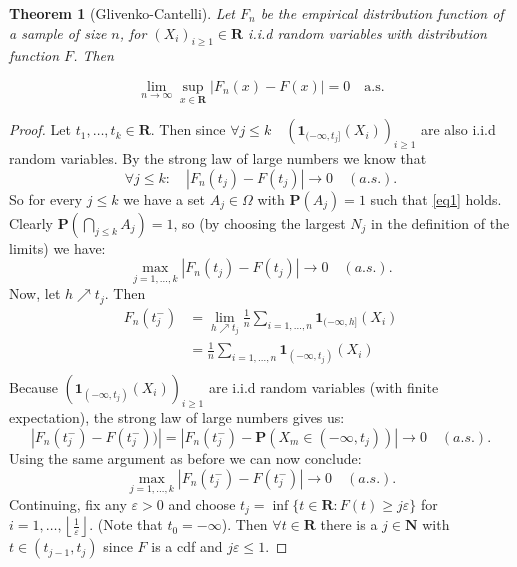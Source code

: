 \documentclass{article}
\newtheorem*{theorem}{Theorem}
\begin{document}
\begin{theorem}[Glivenko-Cantelli]
Let \( F_n \) be the empirical distribution function of a sample of size \( n \),
 for \((X_i)_{i\ge1} \in \mathbf{R}\) i.i.d random variables with distribution function \(F\). Then

\[ \lim_{n \to \infty} \sup_{x \in \mathbf{R}} |F_n(x) - F(x)| = 0 \quad \text{a.s.} \]
\end{theorem}
\begin{proof} 
Let \(t_1,\ldots,t_k \in \mathbf{R}\). Then since \(\forall j\le k \quad (\mathbf{1}_{(-\infty,t_j]}(X_i ))_{i\ge1}\) are also i.i.d random variables.
By the strong law of large numbers we know that 
\begin{equation}
    \label{eq1}
    \forall j \le k: \quad |F_n(t_j)-F(t_j)| \to 0 \quad (a.s.).
\end{equation}
So for every \(j\le k\) we have a set \(A_j \in \Omega\) with \(\mathbf{P}(A_j) = 1\) such that \eqref{eq1} holds.
Clearly \(\mathbf{P}(\bigcap_{j\le k}A_j) = 1\), so (by choosing the largest \(N_j\) in the definition of the limits) we have:
\begin{equation}
    \label{eq2}
    \max_{j= 1,\ldots,k} |F_n(t_j)-F(t_j)| \to 0 \quad (a.s.).
\end{equation}
Now, let \(h \nearrow t_j\). Then
\begin{align*}
    F_n(t_j^-) & = \lim_{h\nearrow t_j} \frac{1}{n} \sum_{i = 1,\ldots,n} \mathbf{1}_{(-\infty,h]}(X_i)\\
    & = \frac{1}{n} \sum_{i = 1,\ldots,n} \mathbf{1}_{(-\infty,t_j)}(X_i)\\
\end{align*}
Because \((\mathbf{1}_{(-\infty,t_j)}(X_i))_{i\ge 1}\) are i.i.d random variables (with finite expectation), the strong law of large numbers gives us:
\begin{equation*}
    |F_n(t_j^-) - F(t_j^-))| = |F_n(t_j^-) - \mathbf{P}(X_m \in (-\infty,t_j))| \to 0 \quad(a.s.).
\end{equation*}
Using the same argument as before we can now conclude:
\begin{equation}
    \label{eq3}
    \max_{j= 1,\ldots,k} |F_n(t_j^-)-F(t_j^-)| \to 0 \quad (a.s.).
\end{equation}
Continuing, fix any \(\varepsilon>0\) and choose \(t_j = \inf\{t \in \mathbf{R} : F(t) \ge j\varepsilon\}\) for \(i= 1,\ldots, \left\lfloor \frac{1}{\varepsilon} \right\rfloor \). (Note that \(t_0 = -\infty\)).
Then \(\forall t \in \mathbf{R}\) there is a \(j \in \mathbf{N}\) with \(t \in (t_{j-1},t_{j})\) since \(F\) is a cdf and \(j\varepsilon \le 1\).

\end{proof}
\end{document}
